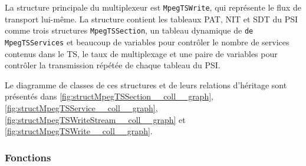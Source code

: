 \documentclass[12pt,a4paper]{article}
\begin{document}


La structure principale du multiplexeur est \texttt{MpegTSWrite}, qui représente le flux de transport lui-même. La structure contient les tableaux  PAT, NIT et SDT du PSI comme trois structures \texttt{MpegTSSection}, un tableau dynamique de \texttt{de MpegTSServices} et beaucoup de variables pour contrôler le nombre de services contenus dans le TS, le taux de multiplexage et une paire de variables pour contrôler la transmission répétée de chaque tableau du PSI.

Le diagramme de classes de ces structures et de leurs relations d'héritage sont présentés dans \autoref{fig:structMpegTSSection__coll__graph}, \autoref{fig:structMpegTSService__coll__graph}, \autoref{fig:structMpegTSWriteStream__coll__graph} et \autoref{fig:structMpegTSWrite__coll__graph}.

\subsubsection{Fonctions}
\end{document}
